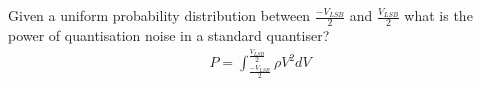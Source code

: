 \subsection{}

Given a uniform probability distribution between $\frac{-V_{LSB}}{2}$ and $\frac{V_{LSB}}{2}$ what is the power of quantisation noise in a standard quantiser?
\begin{align}
    P = \int_{\frac{-V_{LSB}}{2}}^{\frac{V_{LSB}}{2}} \rho V^{2} dV
\end{align}

